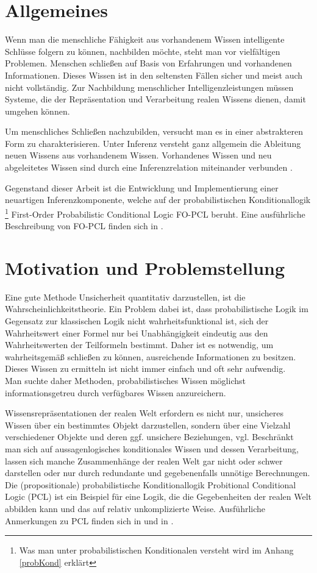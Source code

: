 \documentclass[draft]{scrreprt}
\begin{document}
\section{Allgemeines}

Wenn man die menschliche Fähigkeit aus vorhandenem Wissen intelligente Schlüsse folgern zu können, nachbilden möchte, steht man vor vielfältigen Problemen. Menschen schließen auf Basis von Erfahrungen und vorhandenen Informationen. Dieses Wissen ist in den seltensten Fällen sicher und meist auch nicht vollständig. Zur Nachbildung menschlicher Intelligenzleistungen müssen Systeme, die der Repräsentation und Verarbeitung realen Wissens dienen, damit umgehen können.

Um menschliches Schließen nachzubilden, versucht man es in einer abstrakteren Form zu charakterisieren. Unter Inferenz versteht ganz allgemein die Ableitung neuen Wissens aus vorhandenem Wissen. Vorhandenes Wissen und neu abgeleitetes Wissen sind durch eine Inferenzrelation miteinander verbunden 
\cite[S. 20]{BKI08}.

Gegenstand dieser Arbeit ist die Entwicklung und Implementierung einer neuartigen Inferenzkomponente, welche auf der probabilistischen Konditionallogik \footnote{Was man unter probabilistischen Konditionalen versteht wird im Anhang \ref{probKond} erklärt } First-Order Probabilistic Conditional Logic FO-PCL  beruht. Eine ausführliche Beschreibung von FO-PCL finden sich in \cite[Kap. 6]{Fis10}. 

\section{Motivation und Problemstellung}

Eine gute Methode Unsicherheit quantitativ darzustellen, ist die Wahrscheinlichkeitstheorie. Ein Problem dabei ist, dass probabilistische Logik im Gegensatz zur klassischen Logik nicht wahrheitsfunktional ist, sich der Wahrheitswert einer Formel nur bei Unabhängigkeit  eindeutig aus den Wahrheitswerten der Teilformeln bestimmt. Daher ist es notwendig, um wahrheitsgemäß schließen zu können, ausreichende Informationen zu besitzen. Dieses Wissen zu ermitteln ist nicht immer einfach und oft sehr aufwendig.
\\
 Man suchte daher Methoden, probabilistisches Wissen möglichst informationsgetreu durch verfügbares Wissen anzureichern. 

Wissensrepräsentationen der realen Welt erfordern es nicht nur, unsicheres Wissen über ein bestimmtes Objekt darzustellen, sondern über eine Vielzahl verschiedener Objekte und deren ggf. unsichere Beziehungen, vgl. \cite[S. 19]{Fis09}
Beschränkt man sich auf aussagenlogisches konditionales Wissen und dessen Verarbeitung, lassen sich manche Zusammenhänge der realen Welt gar nicht oder schwer darstellen oder nur durch redundante und gegebenenfalls unnötige Berechnungen. Die (propositionale) probabilistische Konditionallogik Probitional Conditional Logic (PCL)  ist ein Beispiel für eine Logik, die die Gegebenheiten der realen Welt abbilden kann und das auf relativ unkomplizierte Weise. Ausführliche Anmerkungen zu PCL finden sich in \cite{RKI96} und in \cite[Kap. 2.4]{Fis10}. 
\end{document}

